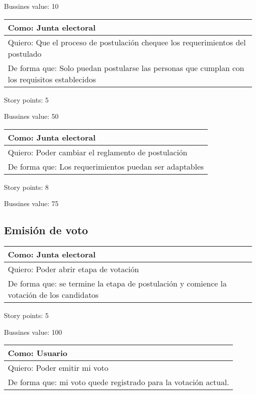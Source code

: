 \medskip
Bussines value: 10


\bigskip

\begin{tabular}{|l|}
\hline
Como: Junta electoral\\
\hline
Quiero: Que el proceso de postulaci\'on chequee los requerimientos del postulado\\
\hline
De forma que: Solo puedan postularse las personas que cumplan con los requisitos establecidos \\
\hline
\end{tabular}

\medskip
Story points: 5

\medskip
Bussines value: 50


\bigskip

\begin{tabular}{|l|}
\hline
Como: Junta electoral\\
\hline
Quiero: Poder cambiar el reglamento de postulaci\'on\\
\hline
De forma que: Los requerimientos puedan ser adaptables \\
\hline
\end{tabular}

\medskip
Story points: 8

\medskip
Bussines value: 75

\bigskip

\subsection*{Emisi\'on de voto}


\begin{tabular}{|l|}
\hline
Como: Junta electoral\\
\hline
Quiero: Poder abrir etapa de votaci\'on\\
\hline
De forma que: se termine la etapa de postulaci\'on y comience la votaci\'on de los candidatos\\
\hline
\end{tabular}

\medskip
Story points: 5

\medskip
Bussines value: 100
\bigskip

\begin{tabular}{|l|}
\hline
Como: Usuario\\
\hline
Quiero: Poder emitir mi voto\\
\hline
De forma que: mi voto quede registrado para la votaci\'on actual.\\
\hline
\end{tabular}

